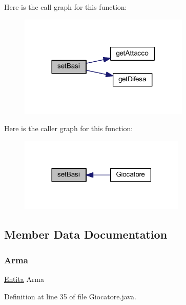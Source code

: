 Here is the call graph for this function\+:
\nopagebreak
\begin{figure}[H]
\begin{center}
\leavevmode
\includegraphics[width=230pt]{class_entita_1_1_giocatore_a38a75be5807f155ff640bfa73518421d_cgraph}
\end{center}
\end{figure}
Here is the caller graph for this function\+:
\nopagebreak
\begin{figure}[H]
\begin{center}
\leavevmode
\includegraphics[width=225pt]{class_entita_1_1_giocatore_a38a75be5807f155ff640bfa73518421d_icgraph}
\end{center}
\end{figure}


\subsection{Member Data Documentation}
\mbox{\label{class_entita_1_1_giocatore_ade56944373ebbc5f5117b39639e3cef5}} 
\subsubsection{\texorpdfstring{Arma}{Arma}}
{\footnotesize\ttfamily \hyperlink{class_entita_1_1_entita}{Entita} Arma}



Definition at line 35 of file Giocatore.\+java.


